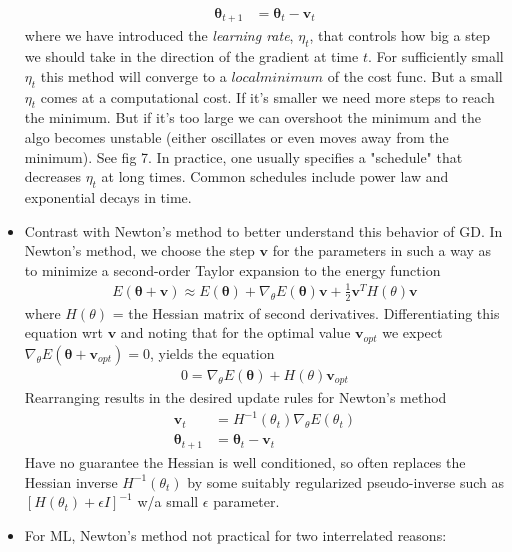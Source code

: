 \documentclass[norsk,a4paper,11pt]{article}
\begin{document}
\begin{itemize}
\begin{align}
			\bm{\theta}_{t+1} &= \bm{\theta}_t - \mathbf{v}_t		
		\end{align}
		where we have introduced the \textit{learning rate}, $\eta_t$, that controls how big a step we should take in the direction of the gradient at time $t$. For sufficiently small $\eta_t$ this method will converge to a $local minimum$ of the cost func. But a small $\eta_t$ comes at a computational cost. If it's smaller we need more steps to reach the minimum. But if it's too large we can overshoot the minimum and the algo becomes unstable (either oscillates or even moves away from the minimum). See fig 7. In practice, one usually specifies a "schedule" that decreases $\eta_t$ at long times. Common schedules include power law and exponential decays in time.
		\item Contrast with Newton's method to better understand this behavior of GD. In Newton's method, we choose the step $\mathbf{v}$ for the parameters in such a way as to minimize a second-order Taylor expansion to the energy function
		\begin{align}
			E(\bm{\theta} + \mathbf{v}) \approx E(\bm{\theta}) + \nabla_\theta E(\bm{\theta})\mathbf{v} + \frac{1}{2} \mathbf{v}^T H(\theta) \mathbf{v}
		\end{align}
		where $H(\theta)$ = the Hessian matrix of second derivatives. Differentiating this equation wrt $\mathbf{v}$ and noting that for the optimal value $\mathbf{v}_{opt}$ we expect $\nabla_\theta E(\bm{\theta} + \mathbf{v}_{opt}) = 0$, yields the equation
		\begin{align}
			0 = \nabla_\theta E(\bm{\theta}) + H(\theta) \mathbf{v}_{opt}
		\end{align}
		Rearranging results in the desired update rules for Newton's method
		\begin{align}
			\mathbf{v}_t &= H^{-1} (\theta_t) \nabla_\theta E(\theta_t) \\
			\bm{\theta}_{t+1} &= \bm{\theta}_t - \mathbf{v}_t
		\end{align}
		Have no guarantee the Hessian is well conditioned, so often replaces the Hessian inverse $H^{-1}(\theta_t)$ by some suitably regularized pseudo-inverse such as $[H(\theta_t)+\epsilon I ]^{-1}$ w/a small $\epsilon$ parameter.
		\item For ML, Newton's method not practical for two interrelated reasons:


\end{itemize}
\end{document}
